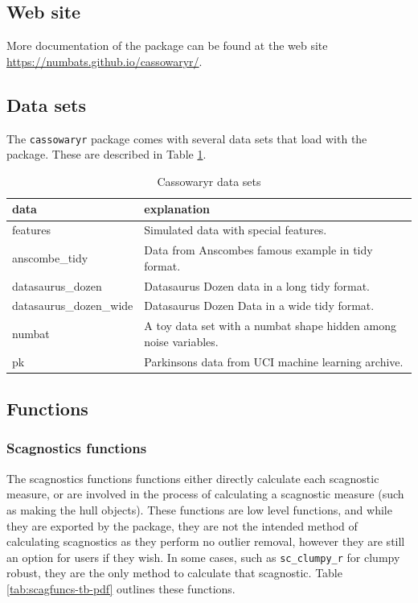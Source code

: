 \subsection{Web site}\label{web-site}

More documentation of the package can be found at the web site \url{https://numbats.github.io/cassowaryr/}.

\subsection{Data sets}\label{data-sets}

The \texttt{cassowaryr} package comes with several data sets that load with the package. These are described in Table \ref{tab:datasets-tb-pdf}.

\begin{table}

\caption{\label{tab:datasets-tb-pdf}Cassowaryr data sets}
\centering
\begin{tabular}[t]{>{\raggedright\arraybackslash}p{4cm}>{\raggedright\arraybackslash}p{8cm}}
\toprule
data & explanation\\
\midrule
features & Simulated data with special features.\\
anscombe\_tidy & Data from Anscombes famous example in tidy format.\\
datasaurus\_dozen & Datasaurus Dozen data in a long tidy format.\\
datasaurus\_dozen\_wide & Datasaurus Dozen Data in a wide tidy format.\\
numbat & A toy data set with a numbat shape hidden among noise variables.\\
\addlinespace
pk & Parkinsons data from UCI machine learning archive.\\
\bottomrule
\end{tabular}
\end{table}

\subsection{Functions}\label{functions}

\subsubsection{Scagnostics functions}\label{scagnostics-functions}

The scagnostics functions functions either directly calculate each scagnostic measure, or are involved in the process of calculating a scagnostic measure (such as making the hull objects). These functions are low level functions, and while they are exported by the package, they are not the intended method of calculating scagnostics as they perform no outlier removal, however they are still an option for users if they wish. In some cases, such as \texttt{sc\_clumpy\_r} for clumpy robust, they are the only method to calculate that scagnostic. Table \ref{tab:scagfuncs-tb-pdf} outlines these functions.

